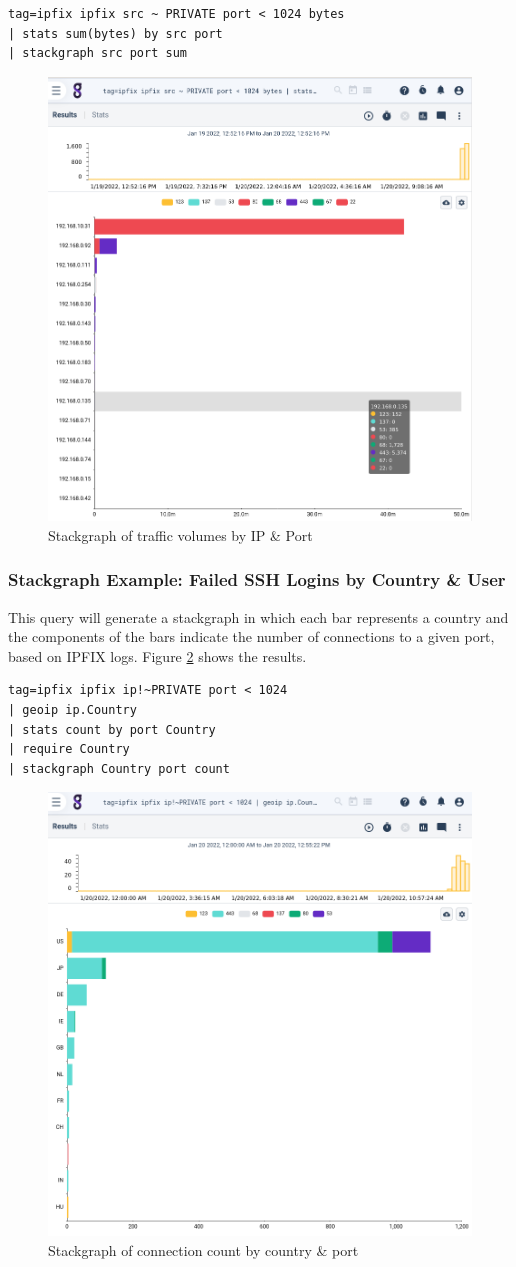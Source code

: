 \begin{Verbatim}[breaklines=true]
tag=ipfix ipfix src ~ PRIVATE port < 1024 bytes 
| stats sum(bytes) by src port 
| stackgraph src port sum
\end{Verbatim}

\begin{figure}
	\includegraphics[width=0.6\linewidth]{images/stackgraph-traffic.png}
	\caption{Stackgraph of traffic volumes by IP \& Port}
	\label{fig:stackgraph-traffic}
\end{figure}

\subsubsection{Stackgraph Example: Failed SSH Logins by Country \& User}

This query will generate a stackgraph in which each bar represents a country and the
components of the bars indicate the number of connections to a given port, based on IPFIX logs.
Figure \ref{fig:stackgraph-connections}
shows the results.

\begin{Verbatim}[breaklines=true]
tag=ipfix ipfix ip!~PRIVATE port < 1024 
| geoip ip.Country 
| stats count by port Country 
| require Country 
| stackgraph Country port count
\end{Verbatim}

\begin{figure}
	\includegraphics[width=0.6\linewidth]{images/stackgraph-connections.png}
	\caption{Stackgraph of connection count by country \& port}
	\label{fig:stackgraph-connections}
\end{figure}


